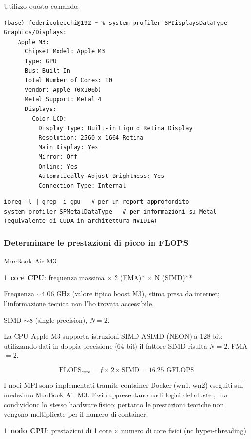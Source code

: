 \documentclass[11pt,a4paper]{article}
\begin{document}
Utilizzo questo comando:
\begin{lstlisting}
(base) federicobecchi@192 ~ % system_profiler SPDisplaysDataType
Graphics/Displays:
    Apple M3:
      Chipset Model: Apple M3
      Type: GPU
      Bus: Built-In
      Total Number of Cores: 10
      Vendor: Apple (0x106b)
      Metal Support: Metal 4
      Displays:
        Color LCD:
          Display Type: Built-in Liquid Retina Display
          Resolution: 2560 x 1664 Retina
          Main Display: Yes
          Mirror: Off
          Online: Yes
          Automatically Adjust Brightness: Yes
          Connection Type: Internal
\end{lstlisting}

\begin{lstlisting}
ioreg -l | grep -i gpu   # per un report approfondito
system_profiler SPMetalDataType   # per informazioni su Metal (equivalente di CUDA in architettura NVIDIA)
\end{lstlisting}

\subsubsection{Determinare le prestazioni di picco in FLOPS}

MacBook Air M3.

\textbf{1 core CPU}: frequenza massima $\times$ 2 (FMA)* $\times$ N (SIMD)**

Frequenza $\sim 4.06$ GHz (valore tipico boost M3), stima presa da internet; l'informazione tecnica non l'ho trovata accessibile.

SIMD $\sim 8$ (single precision), $N = 2$.

La CPU Apple M3 supporta istruzioni SIMD ASIMD (NEON) a 128 bit; utilizzando dati in doppia precisione (64 bit) il fattore SIMD risulta $N=2$. FMA $= 2$.

\begin{equation}
\text{FLOPS}_{\text{core}} = f \times 2 \times \text{SIMD} = 16.25 \text{ GFLOPS}
\end{equation}

I nodi MPI sono implementati tramite container Docker (wn1, wn2) eseguiti sul medesimo MacBook Air M3. Essi rappresentano nodi logici del cluster, ma condividono lo stesso hardware fisico; pertanto le prestazioni teoriche non vengono moltiplicate per il numero di container.

\textbf{1 nodo CPU}: prestazioni di 1 core $\times$ numero di core fisici (no hyper-threading)
\end{document}
